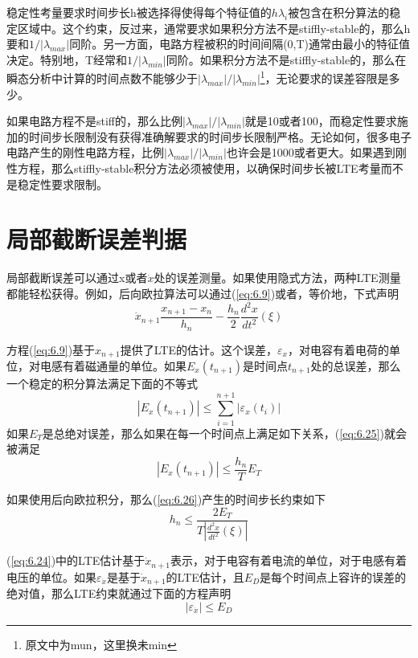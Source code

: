 稳定性考量要求时间步长h被选择得使得每个特征值的$h\lambda_i$被包含在积分算法的稳定区域中。这个约束，反过来，通常要求如果积分方法不是stiffly-stable的，那么h要和$1/|\lambda_{max}|$同阶。另一方面，电路方程被积的时间间隔(0,T)通常由最小的特征值决定。特别地，T经常和$1/|\lambda_{min}|$同阶。如果积分方法不是stiffly-stable的，那么在瞬态分析中计算的时间点数不能够少于$|\lambda_{max}|/|\lambda_{min}|$\footnote{原文中为mun，这里换未min}，无论要求的误差容限是多少。

如果电路方程不是stiff的，那么比例$|\lambda_{max}|/|\lambda_{min}|$就是10或者100，而稳定性要求施加的时间步长限制没有获得准确解要求的时间步长限制严格。无论如何，很多电子电路产生的刚性电路方程，比例$|\lambda_{max}|/|\lambda_{min}|$也许会是1000或者更大。如果遇到刚性方程，那么stiffly-stable积分方法必须被使用，以确保时间步长被LTE考量而不是稳定性要求限制。

\section{局部截断误差判据}
局部截断误差可以通过x或者$\dot{x}$处的误差测量。如果使用隐式方法，两种LTE测量都能轻松获得。例如，后向欧拉算法可以通过(\ref{eq:6.9})或者，等价地，下式声明
\begin{equation}
    \dot{x}_{n+1}\frac{x_{n+1}-x_n}{h_n} - \frac{h_n}{2}\frac{d^2x}{dt^2}(\xi)
    \label{eq:6.24}
\end{equation}

方程(\ref{eq:6.9})基于$x_{n+1}$提供了LTE的估计。这个误差，$\varepsilon_x$，对电容有着电荷的单位，对电感有着磁通量的单位。如果$E_x(t_{n+1})$是时间点$t_{n+1}$处的总误差，那么一个稳定的积分算法满足下面的不等式
\begin{equation}
    |E_x(t_{n+1})| \leq \sum^{n+1}_{i=1}|\varepsilon_x(t_i)|
    \label{eq:6.25}
\end{equation}
如果$E_T$是总绝对误差，那么如果在每一个时间点上满足如下关系，(\ref{eq:6.25})就会被满足
\begin{equation}
    |E_x(t_{n+1})| \leq \frac{h_n}{T}E_T
    \label{eq:6.26}
\end{equation}

如果使用后向欧拉积分，那么(\ref{eq:6.26})产生的时间步长约束如下
\begin{equation}
    h_n \leq \frac{2E_T}{T|\frac{d^2x}{dt^2}(\xi)|}
    \label{eq:6.27}
\end{equation}

(\ref{eq:6.24})中的LTE估计基于$\dot{x}_{n+1}$表示，对于电容有着电流的单位，对于电感有着电压的单位。如果$\varepsilon_{\dot{x}}$是基于$\dot{x}_{n+1}$的LTE估计，且$E_D$是每个时间点上容许的误差的绝对值，那么LTE约束就通过下面的方程声明
\begin{equation}
    |\varepsilon_{\dot{x}}| \leq E_D
    \label{eq:6.28}
\end{equation}

